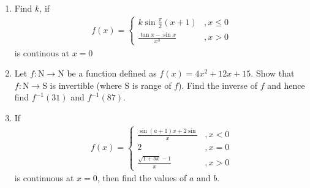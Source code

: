\begin{enumerate}
	\item Find $k$, if
	      \begin{align*}
		      f(x) = \begin{cases} k\sin \frac{\pi}{2}(x+1)    & ,x \leq 0 \\
              \frac{\tan x - \sin x}{x^3} & , x>0
		             \end{cases}
	      \end{align*}
	      is continous at $x=0$

	\item Let $f: \text{N} \rightarrow \text{N}$ be a function defined as
	      $f(x) = 4x^2 + 12x + 15.$
	      Show that $f: \text{N} \rightarrow \text{S}$ is invertible (where S is range of $f$).
	      Find the inverse of $f$ and hence find $f^{-1}(31)$ and $f^{-1}(87)$.


	\item If
	      \begin{align*}
		      f(x) =
		      \begin{cases}
			      \frac{\sin(a+1)x + 2\sin}{x} & ,x<0   \\
			      2                            & ,x = 0 \\
			      \frac{\sqrt{1+bx}-1}{x}      & ,x>0
		      \end{cases}
	      \end{align*}
	      is continuous at $x = 0$, then find the values of $a$ and $b$.


\end{enumerate}
